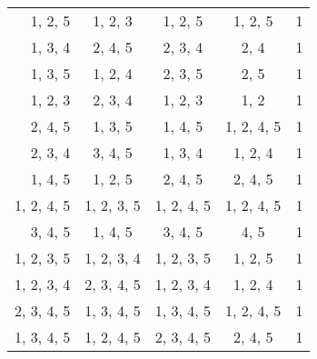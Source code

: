 \begin{solution}
\begin{enumerate}[(a)]
\begin{multicols}{2}
\begin{tabular}[t]{r|c c c r}
                1, 2, 5 & 1, 2, 3 & 1, 2, 5 & 1, 2, 5 & 1\\
                1, 3, 4 & 2, 4, 5 & 2, 3, 4 & 2, 4 & 1\\
                1, 3, 5 & 1, 2, 4 & 2, 3, 5 & 2, 5 & 1\\
                1, 2, 3 & 2, 3, 4 & 1, 2, 3 & 1, 2 & 1\\
                2, 4, 5 & 1, 3, 5 & 1, 4, 5 & 1, 2, 4, 5 & 1\\
                2, 3, 4 & 3, 4, 5 & 1, 3, 4 & 1, 2, 4 & 1\\
                1, 4, 5 & 1, 2, 5 & 2, 4, 5 & 2, 4, 5 & 1\\
                1, 2, 4, 5 & 1, 2, 3, 5 & 1, 2, 4, 5 & 1, 2, 4, 5 & 1\\
                3, 4, 5 & 1, 4, 5 & 3, 4, 5 & 4, 5 & 1\\
                1, 2, 3, 5 & 1, 2, 3, 4 & 1, 2, 3, 5 & 1, 2, 5 & 1\\
                1, 2, 3, 4 & 2, 3, 4, 5 & 1, 2, 3, 4 & 1, 2, 4 & 1\\
                2, 3, 4, 5 & 1, 3, 4, 5 & 1, 3, 4, 5 & 1, 2, 4, 5 & 1\\
                1, 3, 4, 5 & 1, 2, 4, 5 & 2, 3, 4, 5 & 2, 4, 5 & 1
           \end{tabular}
\end{multicols}


\end{enumerate}
\end{solution}
